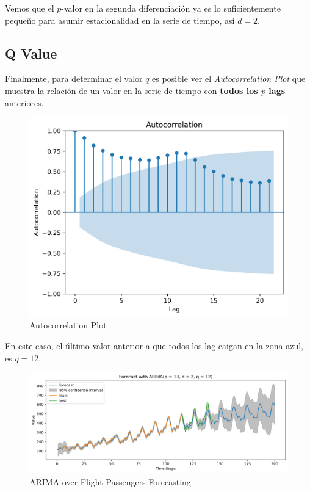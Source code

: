 Vemos que el $p$-valor en la segunda diferenciación ya es lo suficientemente pequeño para asumir estacionalidad en la serie de tiempo, así $d=2$. 

\subsection{Q Value}
Finalmente, para determinar el valor $q$ es posible ver el \textit{Autocorrelation Plot} que muestra la relación de un valor en la serie de tiempo con \textbf{todos los $p$ lags} anteriores. 
\begin{figure}[H]
    \center
    \includegraphics[scale=0.5]{notebooks/TS/img/autocorrelation.png}
    \caption{Autocorrelation Plot}
\end{figure}
En este caso, el último valor anterior a que todos los lag caigan en la zona azul, es $q=12$.
\begin{figure}[H]
    \center
    \includegraphics[scale=0.5]{notebooks/TS/img/arima_results.png}
    \caption{ARIMA over Flight Passengers Forecasting}
\end{figure}

